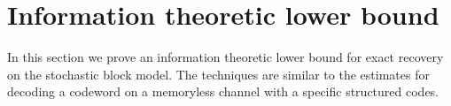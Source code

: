 \documentclass[english]{article}
\newtheorem{theorem}{Theorem}
\newcommand{\1}{\textbf{1}}
\begin{document}
%
%
























\section{Information theoretic lower bound}
In this section we prove an information theoretic lower bound for exact recovery on the stochastic block model. The techniques are similar to the estimates for decoding a codeword on a memoryless channel with a specific structured codes. 
\end{document}

